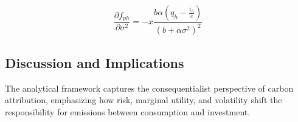 \documentclass[12pt,a4paper]{article}
\begin{document}
\begin{equation}
\frac{\partial f_{ph}}{\partial \sigma^2} = - x \frac{b \alpha \left(q_h - \frac{i_h}{c} \right)}{(b + \alpha \sigma^2)^2}
\end{equation}

\subsection*{Discussion and Implications}

The analytical framework captures the consequentialist perspective of carbon attribution, emphasizing how risk, marginal utility, and volatility shift the responsibility for emissions between consumption and investment.
\end{document}
